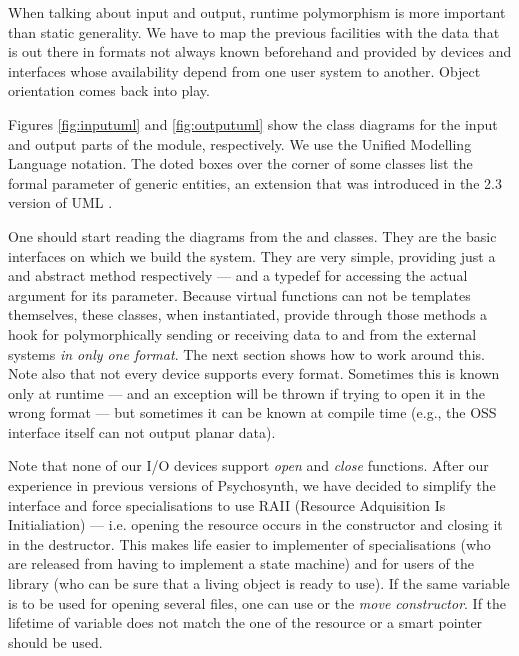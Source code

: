  When talking about input and output,
runtime polymorphism is more important than static generality. We have
to map the previous facilities with the data that is out there in
formats not always known beforehand and provided by devices and
interfaces whose availability depend from one user system to
another. Object orientation comes back into play.

Figures \ref{fig:inputuml} and \ref{fig:outputuml} show the class
diagrams for the input and output parts of the module,
respectively. We use the Unified Modelling Language notation. The
doted boxes over the corner of some classes list the formal parameter
of generic entities, an extension that was introduced in the 2.3
version of UML \cite{umlspec}.

One should start reading the diagrams from the  and
 classes. They are the basic interfaces on which we build
the system. They are very simple, providing just a  and  abstract method
respectively --- and a typedef for accessing the actual argument for
its  parameter. Because virtual functions can not be
templates themselves, these classes, when instantiated, provide
through those methods a hook for polymorphically sending or receiving
data to and from the external systems \emph{in only one
  format}. The next section shows how to work around this. Note also
that not every device supports every format. Sometimes this is known
only at runtime --- and an exception will be thrown if trying to open
it in the wrong format --- but sometimes it can be known at compile
time (e.g., the OSS interface itself can not output planar data).

 Note that none of
our I/O devices support \emph{open} and \emph{close} functions. After
our experience in previous versions of Psychosynth, we have decided to
simplify the interface and force specialisations to use RAII (Resource
Adquisition Is Initialiation) --- i.e. opening the resource occurs in
the constructor and closing it in the destructor. This makes life
easier to implementer of specialisations (who are released from having
to implement a state machine) and for users of the library (who can be
sure that a living object is ready to use). If the same variable is to
be used for opening several files, one can use  or the
\emph{move constructor}. If the lifetime of variable does not match
the one of the resource  or a smart pointer
should be used.

